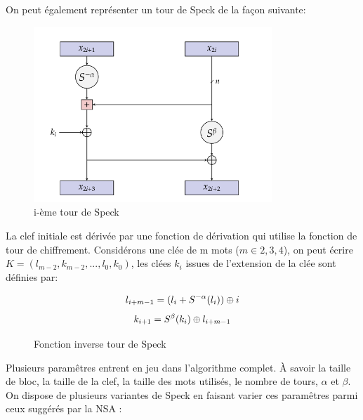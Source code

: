 		On peut également représenter un tour de Speck de la façon suivante:

		\begin{figure}[H]
			\centering
			\includegraphics[width=0.8\textwidth]{imgs/roundSpeck.png}
			\caption{i-ème tour de Speck}
		 	\label{roundSpeck}
		\end{figure}

		\vspace{0.3cm}

		La clef initiale est dérivée par une fonction de dérivation qui utilise la
		fonction de tour de chiffrement. Considérons une clée de m mots ($m\in {2,3,4}$),
		on peut écrire $ K = (l_{m-2},k_{m-2}, ..., l_0,k_0)$, les clées $k_i$ issues
		de l'extension de la clée sont définies par:

		\begin{figure}[H]
			\centering
			\[
				l_{i+m-1} = (l_i + S^{-\alpha}(l_i)) \mathbin{\oplus} i
			\]
			\[
				k_{i+1} = S^\beta (k_i) \mathbin{\oplus} l_{i+m-1}
			\]
			\caption{Fonction inverse tour de Speck}
			\label{tourSpeck}
		\end{figure}

			Plusieurs paramêtres entrent en jeu dans l'algorithme complet. À savoir
		la taille de bloc, la taille de la clef, la taille des mots utilisés,
		le nombre de tours, $\alpha$ et $\beta$. On dispose de plusieurs variantes
		de Speck en faisant varier ces paramêtres parmi ceux suggérés par la NSA \cite{speck_iot}:



		\vspace{0.5cm}

